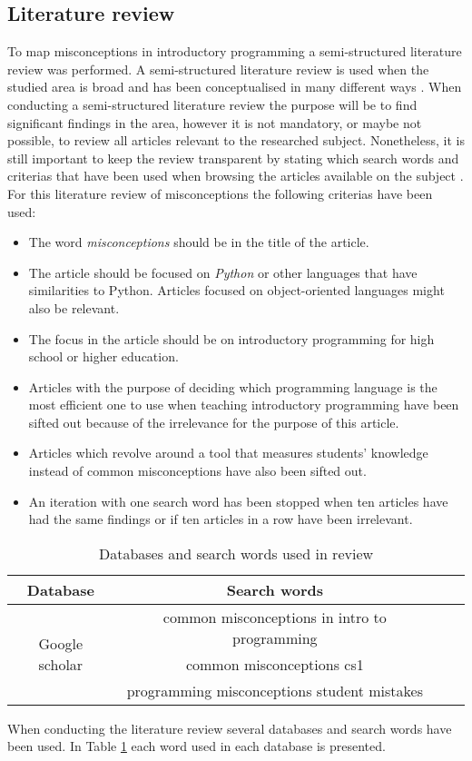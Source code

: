 \documentclass[onecolumn]{article}
\begin{document}
\subsection{Literature review}
To map misconceptions in introductory programming a semi-structured literature review was performed. A semi-structured literature review is used when the studied area is broad and has been conceptualised in many different ways \parencite{Snyder2019}. When conducting a semi-structured literature review the purpose will be to find significant findings in the area, however it is not mandatory, or maybe not possible, to review all articles relevant to the researched subject. Nonetheless, it is still important to keep the review transparent by stating which search words and criterias that have been used when browsing the articles available on the subject \parencite{Snyder2019}.
For this literature review of misconceptions the following criterias have been used:
\begin{itemize}
\item The word \emph{misconceptions} should be in the title of the article.
\item The article should be focused on \emph{Python} or other languages that have similarities to Python. Articles focused on object-oriented languages might also be relevant.
\item The focus in the article should be on introductory programming for high school or higher education.
\item Articles with the purpose of deciding which programming language is the most efficient one to use when teaching introductory programming have been sifted out because of the irrelevance for the purpose of this article.
\item Articles which revolve around a tool that measures students' knowledge instead of common misconceptions have also been sifted out.
\item An iteration with one search word has been stopped when ten articles have had the same findings or if ten articles in a row have been irrelevant.
\end{itemize}
\begin{table}[h]
\centering
\begin{tabular}{ |c|c|c|c| }
\hline
Database & Search words\\
\hline
\multirow{3}{4em}{Google scholar} & common misconceptions in intro to programming \\
& common misconceptions cs1 \\
& programming misconceptions student mistakes \\
\hline
\end{tabular}
\caption{Databases and search words used in review}
\label{databasesandwords}
\end{table}
When conducting the literature review several databases and search words have been used. In Table \ref{databasesandwords} each word used in each database is presented.
\end{document}
